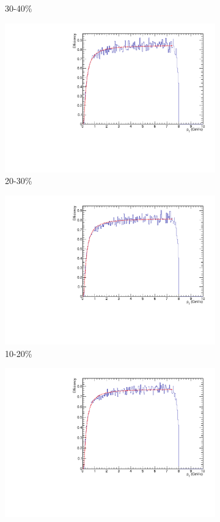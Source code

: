 \begin{figure}[htbp]
\begin{subfigure}{0.5\textwidth}
		\caption{30-40\%}
		\label{fig:assoheffc}
	\end{subfigure}	
	\begin{subfigure}{0.5\textwidth}
		\includegraphics[width=.9\textwidth]{Plots/Correlations/hadron_efficiency/hadron_efficiency_centbin_5.pdf}
		\caption{20-30\%}
		\label{fig:assoheffd}
	\end{subfigure}	
	\begin{subfigure}{0.5\textwidth}
		\includegraphics[width=.9\textwidth]{Plots/Correlations/hadron_efficiency/hadron_efficiency_centbin_6.pdf}
		\caption{10-20\%}
		\label{fig:assoheffe}
	\end{subfigure}	
	\begin{subfigure}{0.5\textwidth}
		\includegraphics[width=.9\textwidth]{Plots/Correlations/hadron_efficiency/hadron_efficiency_centbin_7.pdf}

\end{subfigure}
\end{figure}
